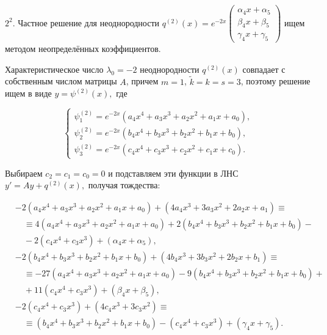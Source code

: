 \documentclass[11pt]{article}
\begin{document}
{%

\smallskip
$2^2.$ Частное решение для неоднородности $q^{(2)}(x) = e^{-2x} \begin{pmatrix} \alpha_4 x + \alpha_5 \\ \beta_4 x + \beta_5 \\ \gamma_4 x + \gamma_5 \end{pmatrix}$ ищем методом неопределённых коэффициентов.

Характеристическое число $\lambda_0 = -2$ неоднородности $q^{(2)}(x)$ совпадает с собственным числом матрицы $A$, причем $m=1$, $\tilde{k} = k = s = 3$, поэтому решение ищем в виде $y=\psi^{(2)}(x),$ где

\[
\begin{cases}
\psi_1^{(2)} = e^{-2x} (a_4 x^4 + a_3 x^3 + a_2 x^2 + a_1 x + a_0), \\
\psi_2^{(2)} = e^{-2x} (b_4 x^4 + b_3 x^3 + b_2 x^2 + b_1 x + b_0), \\
\psi_3^{(2)} = e^{-2x} (c_4 x^4 + c_3 x^3 + c_2 x^2 + c_1 x + c_0).
\end{cases}
\]

Выбираем $c_2 = c_1 = c_0 = 0$ и подставляем эти функции в ЛНС $y'=Ay+q^{(2)}(x),$ получая тождества:

\[
\begin{aligned}
&-2(a_4x^4 + a_3x^3 + a_2x^2 + a_1x + a_0) + (4a_4x^3 + 3a_3x^2 + 2a_2x + a_1) \equiv \\
&\quad \equiv4(a_4x^4 + a_3x^3 + a_2x^2 + a_1x + a_0) + 2(b_4x^4 + b_3x^3 + b_2x^2 + b_1x + b_0)- \\
&\quad - 2(c_4x^4 + c_3x^3) + (\alpha_4x + \alpha_5), \\
%
&-2(b_4x^4 + b_3x^3 + b_2x^2 + b_1x + b_0) + (4b_4x^3 + 3b_3x^2 + 2b_2x + b_1) \equiv \\
&\quad \equiv-27(a_4x^4 + a_3x^3 + a_2x^2 + a_1x + a_0) - 9(b_4x^4 + b_3x^3 + b_2x^2 + b_1x + b_0)+ \\
&\quad + 11(c_4x^4 + c_3x^3) + (\beta_4x + \beta_5), \\
%
&-2(c_4x^4 + c_3x^3) + (4c_4x^3 + 3c_3x^2) \equiv \\
&\quad \equiv(b_4x^4 + b_3x^3 + b_2x^2 + b_1x + b_0) - (c_4x^4 + c_3x^3) + (\gamma_4x + \gamma_5).
\end{aligned}
\]

}
\end{document}
